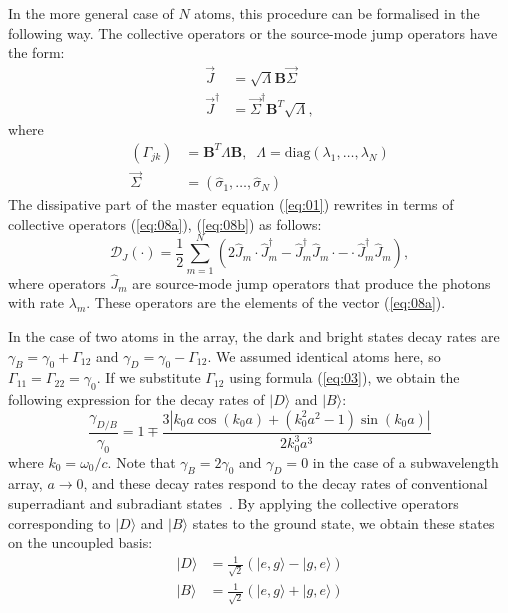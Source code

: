 \documentclass[aps,prl,twocolumn,superscriptaddress,showpacs,amsmath,amssymb]{revtex4-2}
\begin{document}
In the more general case of $N$ atoms, this procedure can be formalised in the following way. 
The collective operators or the source-mode jump operators have the form:
\begin{align}
    \vec{J} &= \sqrt{\Lambda} \mathbf{B} \vec{\Sigma} \label{eq:08a} \\
    \vec{J}^\dagger &= \vec{\Sigma}^\dagger \mathbf{B}^T \sqrt{\Lambda},
    \label{eq:08b}
\end{align}
where 
\begin{align}
    \left(\Gamma_{jk}\right) &= \mathbf{B}^T \Lambda \mathbf{B}, \;\; 
    \Lambda = \mathrm{diag}\left(\lambda_1, \ldots, \lambda_N \right) \\ 
    \vec{\Sigma} &= \left( \hat{\sigma}_1, \ldots, \hat{\sigma}_N \right)
    \label{eq:09}
\end{align}
The dissipative part of the master equation (\ref{eq:01}) rewrites in terms of collective operators (\ref{eq:08a}), (\ref{eq:08b}) as follows:
\begin{equation}
    \mathcal{D}_J(\cdot) = \frac{1}{2} \sum_{m=1}^N \left( 2 \hat{J}_m \cdot \hat{J}_m^\dagger - \hat{J}_m^\dagger \hat{J}_m \cdot - \cdot \hat{J}_m^\dagger \hat{J}_m \right),
    \label{eq:10}
\end{equation}
where operators $\hat{J}_m$ are source-mode jump operators that produce the photons with rate $\lambda_m$. These operators are the elements of the vector (\ref{eq:08a}).

In the case of two atoms in the array, the dark and bright states decay rates are $\gamma_{B} = \gamma_0 + \Gamma_{12}$ and $\gamma_{D} = \gamma_0 - \Gamma_{12}$. 
We assumed identical atoms here, so $\Gamma_{11} = \Gamma_{22} = \gamma_0$. 
If we substitute $\Gamma_{12}$ using formula (\ref{eq:03}), we obtain the following expression for the decay rates of $|D\rangle$ and $|B \rangle$:
\begin{equation}
\frac{\gamma_{D/B}}{\gamma_0} = 1 \mp \frac{3 \left| k_0 a \cos \left( k_0 a \right)+ \left(k_0^2 a^2 -1\right)\sin \left( k_0 a \right)\right| }{2 k_0^3 a^3}
    \label{eq:11}
\end{equation}
where $k_0 = \omega_0 / c$.
Note that $\gamma_B = 2 \gamma_0$ and $\gamma_D = 0$ in the case of a subwavelength array, $a \to 0$, and these decay rates respond to the decay rates of conventional superradiant and subradiant states~\cite{dicke1954coherence,nefedkin2017bad,nefedkin2017superradiance,masson_many-body_2020}.
By applying the collective operators corresponding to $|D\rangle$ and $|B \rangle$ states to the ground state, we obtain these states on the uncoupled basis:
\begin{align}
    \label{eq:11a}
    |D \rangle &= \frac{1}{\sqrt{2}} \left( |e,g\rangle - |g,e\rangle \right)\\
    \label{eq:11b}
    |B \rangle &= \frac{1}{\sqrt{2}} \left( |e,g\rangle + |g,e\rangle \right)
\end{align}
\end{document}
